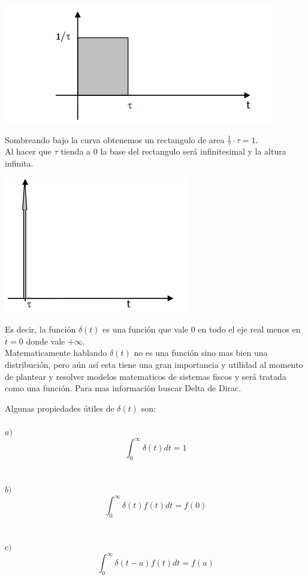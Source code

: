 \documentclass[]{article}
\begin{document}
	\includegraphics{../../../Imagenes/Superior/TransformadaDeLaplace/Laplace06.PNG}
	
	Sombreando bajo la curva obtenemos un rectangulo de area $\frac{1}{\tau} \cdot \tau = 1$.\\
	Al hacer que $\tau$ tienda a $0$ la base del rectangulo será infinitesimal y la altura infinita.
	
	\includegraphics{../../../Imagenes/Superior/TransformadaDeLaplace/Laplace07.PNG}

Es decir, la función $\delta(t)$ es una función que vale $0$ en todo el eje real menos en $t = 0$ donde vale $+\infty$.\\
Matematicamente hablando $\delta(t)$ no es una función sino mas bien una distribución, pero aún así esta tiene una gran importancia y utilidad al momento de plantear y resolver modelos matematicos de sistemas fiscos y será tratada como una función. Para mas información buscar Delta de Dirac.

Algunas propiedades útiles de $\delta(t)$ son:
\\
\\
$a)$
$$
\int_{0}^{\infty} \delta(t) dt = 1
$$
\\
\\
$b)$
$$
\int_{0}^{\infty} \delta(t)f(t) dt = f(0)
$$
\\
\\
$c)$
$$
\int_{0}^{\infty} \delta(t-a)f(t) dt = f(a)
$$
\\
\\
\\
\end{document}
